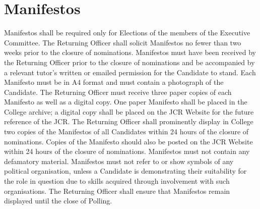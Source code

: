 \section{Manifestos} \label{sec:manifestos}
\npara Manifestos shall be required only for Elections of the members of the Executive Committee.
\npara The Returning Officer shall solicit Manifestos no fewer than two weeks prior to the closure of nominations.
\npara Manifestos must have been received by the Returning Officer prior to the closure of nominations and be accompanied by a relevant tutor's written or emailed permission for the Candidate to stand.
\npara Each Manifesto must be in A4 format and must contain a photograph of the Candidate. The Returning Officer must receive three paper copies of each Manifesto as well as a digital copy.
\npara One paper Manifesto shall be placed in the College archive; a digital copy shall be placed on the JCR Website for the future reference of the JCR.
\npara The Returning Officer shall prominently display in College two copies of the Manifestos of all Candidates within 24 hours of the closure of nominations. Copies of the Manifesto should also be posted on the JCR Website within 24 hours of the closure of nominations.
\npara Manifestos must not contain any defamatory material.
\npara Manifestos must not refer to or show symbols of any political organisation, unless a Candidate is demonstrating their suitability for the role in question due to skills acquired through involvement with such organisations.
\npara The Returning Officer shall ensure that Manifestos remain displayed until the close of Polling.
